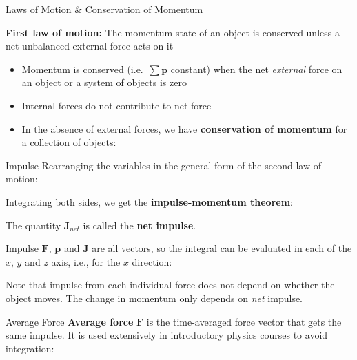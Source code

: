 \documentclass[12pt,compress,aspectratio=169]{beamer}
\begin{document}
\begin{frame}{Laws of Motion \& Conservation of Momentum}

  
  \textbf{First law of motion:} The momentum state of an object is conserved
  unless a net unbalanced external force acts on it
  \begin{itemize}
  \item Momentum is conserved (i.e.\ $\sum\bm{p}$ constant) when the net
    \emph{external} force on an object or a system of objects is zero
  \item Internal forces do not contribute to net force
  \item In the absence of external forces,  we have
    \textbf{conservation of momentum} for a collection of objects:

  \end{itemize} 
\end{frame}


\begin{frame}{Impulse}
  Rearranging the variables in the general form of the second law of motion:
  

  Integrating both sides, we get the \textbf{impulse-momentum theorem}:
 
  
  The quantity $\bm{J}_{net}$ is called the \textbf{net impulse}.
\end{frame}



\begin{frame}{Impulse}
  $\bm{F}$, $\bm{p}$ and $\bm{J}$ are all vectors, so the integral can be
  evaluated in each of the $x$, $y$ and $z$ axis, i.e., for the $x$ direction:

  
  Note that impulse from each individual force does not depend on whether the
  object moves. The change in momentum only depends on \emph{net} impulse.
\end{frame}



\begin{frame}{Average Force}
  \textbf{Average force} $\overline{\bm{F}}$ is the time-averaged force vector
  that gets the same impulse. It is used extensively in introductory physics
  courses to avoid integration:

\end{frame}
\end{document}
